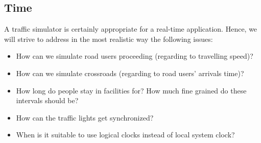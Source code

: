 
\subsection{Time}\label{sec:pa-time-problems}
A traffic simulator is certainly appropriate for a real-time application.
Hence, we will strive to address in the most realistic way the following
issues:

\begin{itemize}
\item How can we simulate road users proceeding (regarding to travelling
  speed)?
\item How can we simulate crossroads (regarding to road users' arrivals time)?
\item How long do people stay in facilities for?
How much fine grained do these intervals should be?
\item How can the traffic lights get synchronized?
\item When is it suitable to use logical clocks instead of local system clock?
\end{itemize}
